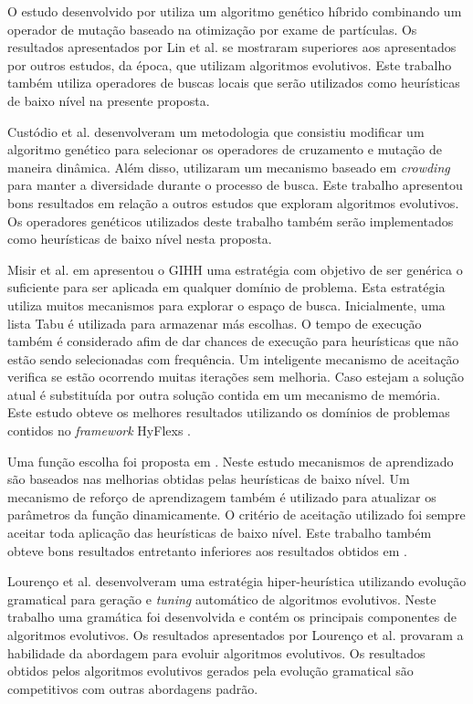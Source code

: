 O estudo desenvolvido por \cite{lin2011protein} utiliza um algoritmo genético híbrido combinando um operador de mutação baseado na otimização por exame de partículas. Os resultados apresentados por Lin et al. se mostraram superiores aos apresentados por outros estudos, da época, que utilizam algoritmos evolutivos. Este trabalho também utiliza operadores de buscas locais que serão utilizados como heurísticas de baixo nível na presente proposta. 


Custódio et al. \cite{custodio2014multiple} desenvolveram um metodologia que consistiu modificar um algoritmo genético para selecionar os operadores de cruzamento e mutação de maneira dinâmica. Além disso, utilizaram um mecanismo baseado em \textit{crowding}  para manter a diversidade durante o processo de busca. Este trabalho apresentou bons resultados em relação a outros estudos que exploram algoritmos evolutivos. Os operadores genéticos utilizados deste trabalho também serão implementados como heurísticas de baixo nível nesta proposta. 


Misir et al. em \cite{misir2012intelligent} apresentou o GIHH uma estratégia com objetivo de ser genérica o suficiente para ser aplicada em qualquer domínio de problema. Esta estratégia utiliza muitos mecanismos para explorar o espaço de busca. Inicialmente, uma lista Tabu é utilizada para armazenar más escolhas. O tempo de execução também é considerado afim de dar chances de execução para heurísticas que não estão sendo selecionadas com frequência. Um inteligente mecanismo de aceitação verifica se estão ocorrendo muitas iterações sem melhoria. Caso estejam a solução atual é substituída por outra solução contida em um mecanismo de memória. Este estudo obteve os melhores resultados utilizando os domínios de problemas contidos no \textit{framework} HyFlexs \cite{ochoa2012hyflex}.

Uma função escolha foi proposta em \cite{drake2012improved}. Neste estudo mecanismos de aprendizado são baseados nas melhorias obtidas pelas heurísticas de baixo nível. Um mecanismo de reforço de aprendizagem também é utilizado para atualizar os parâmetros da função dinamicamente. O critério de aceitação utilizado foi sempre aceitar toda aplicação das heurísticas de baixo nível. Este trabalho também obteve bons resultados entretanto inferiores aos resultados obtidos em \cite{misir2012intelligent}.




Lourenço et al. \cite{lourencco2012evolving} desenvolveram uma estratégia hiper-heurística utilizando evolução gramatical para geração e \textit{tuning} automático de algoritmos evolutivos. Neste trabalho uma gramática foi desenvolvida e contém os principais componentes de algoritmos evolutivos. Os resultados apresentados por Lourenço et al. provaram a habilidade da abordagem para evoluir algoritmos evolutivos. Os resultados obtidos pelos algoritmos evolutivos gerados pela evolução gramatical são competitivos com outras abordagens padrão. 



